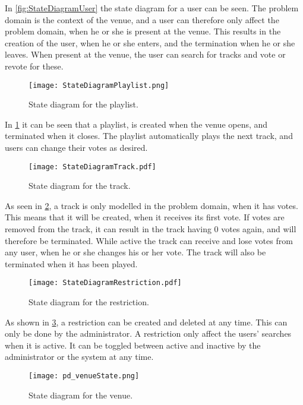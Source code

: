 In \cref{fig:StateDiagramUser} the state diagram for a user can be seen. The problem domain is the context of the venue, and a user can therefore only affect the problem domain, when he or she is present at the venue. This results in the creation of the user, when he or she enters, and the termination when he or she leaves. When present at the venue, the user can search for tracks and vote or revote for these.

\begin{figure}[H]
  \centering
  \texttt{[image: StateDiagramPlaylist.png]}
  \caption{State diagram for the playlist.}\label{fig:StateDiagramPlaylist}
\end{figure}

In \cref{fig:StateDiagramPlaylist} it can be seen that a playlist, is created when the venue opens, and terminated when it closes. The playlist automatically plays the next track, and users can change their votes as desired.

\begin{figure}[H]
  \centering
  \texttt{[image: StateDiagramTrack.pdf]}
  \caption{State diagram for the track.}\label{fig:StateDiagramTrack}
\end{figure}

As seen in \cref{fig:StateDiagramTrack}, a track is only modelled in the problem domain, when it has votes. This means that it will be created, when it receives its first vote. If votes are removed from the track, it can result in the track having 0 votes again, and will therefore be terminated. While active the track can receive and lose votes from any user, when he or she changes his or her vote. The track will also be terminated when it has been played. 

\begin{figure}[H]
  \centering
  \texttt{[image: StateDiagramRestriction.pdf]}
  \caption{State diagram for the restriction.}\label{fig:StateDiagramRestriction}
\end{figure}

As shown in \cref{fig:StateDiagramRestriction}, a restriction can be created and deleted at any time. This can only be done by the administrator. A restriction only affect the users' searches when it is active. It can be toggled between active and inactive by the administrator or the system at any time.

\begin{figure}[H]
  \centering
  \texttt{[image: pd\_venueState.png]}
  \caption{State diagram for the venue.}\label{fig:StateDiagramVenue}
\end{figure}


